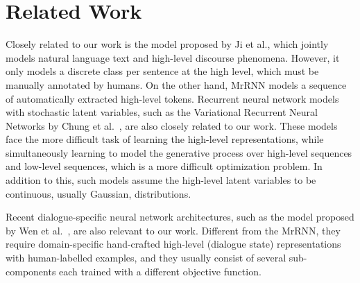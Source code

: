 \documentclass{article}
\begin{document}
\section{Related Work}
Closely related to our work is the model proposed by Ji et al.\cite{ji2016latent},
which jointly models natural language text and high-level discourse phenomena.
However, it only models a discrete class per sentence at the high level, which must be manually annotated by humans.
On the other hand, MrRNN models a sequence of automatically extracted high-level tokens.
Recurrent neural network models with stochastic latent variables, such as the Variational Recurrent Neural Networks by Chung et al.~\cite{chung2015recurrent}, are also closely related to our work.
These models face the more difficult task of learning the high-level representations,
while simultaneously learning to model the generative process over high-level sequences and low-level sequences,
which is a more difficult optimization problem.
In addition to this, such models assume the high-level latent variables to be continuous, usually Gaussian, distributions.

Recent dialogue-specific neural network architectures, such as the model proposed by Wen et al.~\cite{wen2016network}, are also relevant to our work.
Different from the MrRNN, they require domain-specific hand-crafted high-level (dialogue state) representations with human-labelled examples, and they usually consist of several sub-components each trained with a different objective function.



 
\end{document}
